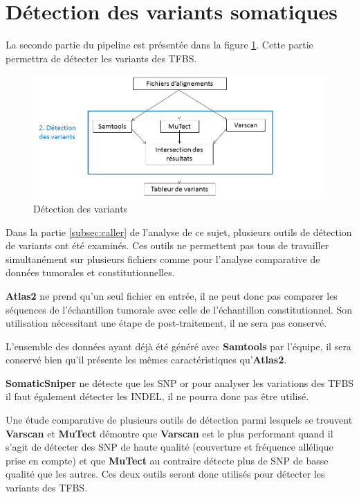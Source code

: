 \section{Détection des variants somatiques}\label{sec:detec}

La seconde partie du pipeline est présentée dans la figure \ref{fig:part2}. Cette partie permettra de détecter les variants des TFBS.

\begin{figure}[h]
\centering
\includegraphics[scale=0.6]{Figures/partie2.png}
\caption{Détection des variants}
\label{fig:part2}
\end{figure}

Dans la partie \ref{subsec:caller} de l'analyse de ce sujet, plusieurs outils de détection de variants ont été examinés. Ces outils ne permettent pas tous de travailler simultanément sur plusieurs fichiers comme pour l'analyse comparative de données tumorales et constitutionnelles. 

\textbf{Atlas2} ne prend qu'un seul fichier en entrée, il ne peut donc pas comparer les séquences de l'échantillon tumorale avec celle de l'échantillon constitutionnel. Son utilisation nécessitant une étape de post-traitement, il ne sera pas conservé.

L'ensemble des données ayant déjà été généré avec \textbf{Samtools} par l'équipe, il sera conservé bien qu'il présente les mêmes caractéristiques qu'\textbf{Atlas2}.

\textbf{SomaticSniper} ne détecte que les SNP or pour analyser les variations des TFBS il faut également détecter les INDEL, il ne pourra donc pas être utilisé.

Une étude comparative de plusieurs outils de détection parmi lesquels se trouvent \textbf{Varscan} et \textbf{MuTect} \citep {Detecting} démontre que \textbf{Varscan} est le plus performant quand il s'agit de détecter des SNP de haute qualité (couverture et fréquence allélique prise en compte) et que \textbf{MuTect} au contraire détecte plus de SNP de basse qualité que les autres. Ces deux outils seront donc utilisés pour détecter les variants des TFBS. 

